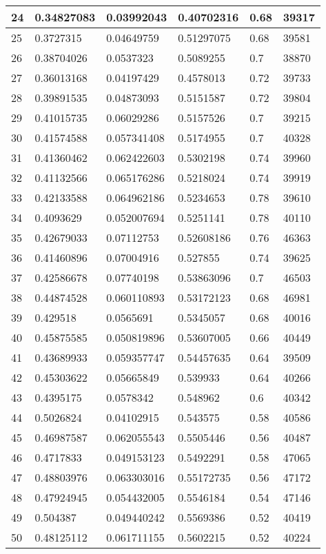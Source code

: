 \begin{longtable}{|l|l|l|l|l|l|}
24 & 0.34827083 & 0.03992043 & 0.40702316 & 0.68 & 39317 \\ \hline 
25 & 0.3727315 & 0.04649759 & 0.51297075 & 0.68 & 39581 \\ \hline 
26 & 0.38704026 & 0.0537323 & 0.5089255 & 0.7 & 38870 \\ \hline 
27 & 0.36013168 & 0.04197429 & 0.4578013 & 0.72 & 39733 \\ \hline 
28 & 0.39891535 & 0.04873093 & 0.5151587 & 0.72 & 39804 \\ \hline 
29 & 0.41015735 & 0.06029286 & 0.5157526 & 0.7 & 39215 \\ \hline 
30 & 0.41574588 & 0.057341408 & 0.5174955 & 0.7 & 40328 \\ \hline 
31 & 0.41360462 & 0.062422603 & 0.5302198 & 0.74 & 39960 \\ \hline 
32 & 0.41132566 & 0.065176286 & 0.5218024 & 0.74 & 39919 \\ \hline 
33 & 0.42133588 & 0.064962186 & 0.5234653 & 0.78 & 39610 \\ \hline 
34 & 0.4093629 & 0.052007694 & 0.5251141 & 0.78 & 40110 \\ \hline 
35 & 0.42679033 & 0.07112753 & 0.52608186 & 0.76 & 46363 \\ \hline 
36 & 0.41460896 & 0.07004916 & 0.527855 & 0.74 & 39625 \\ \hline 
37 & 0.42586678 & 0.07740198 & 0.53863096 & 0.7 & 46503 \\ \hline 
38 & 0.44874528 & 0.060110893 & 0.53172123 & 0.68 & 46981 \\ \hline 
39 & 0.429518 & 0.0565691 & 0.5345057 & 0.68 & 40016 \\ \hline 
40 & 0.45875585 & 0.050819896 & 0.53607005 & 0.66 & 40449 \\ \hline 
41 & 0.43689933 & 0.059357747 & 0.54457635 & 0.64 & 39509 \\ \hline 
42 & 0.45303622 & 0.05665849 & 0.539933 & 0.64 & 40266 \\ \hline 
43 & 0.4395175 & 0.0578342 & 0.548962 & 0.6 & 40342 \\ \hline 
44 & 0.5026824 & 0.04102915 & 0.543575 & 0.58 & 40586 \\ \hline 
45 & 0.46987587 & 0.062055543 & 0.5505446 & 0.56 & 40487 \\ \hline 
46 & 0.4717833 & 0.049153123 & 0.5492291 & 0.58 & 47065 \\ \hline 
47 & 0.48803976 & 0.063303016 & 0.55172735 & 0.56 & 47172 \\ \hline 
48 & 0.47924945 & 0.054432005 & 0.5546184 & 0.54 & 47146 \\ \hline 
49 & 0.504387 & 0.049440242 & 0.5569386 & 0.52 & 40419 \\ \hline 
50 & 0.48125112 & 0.061711155 & 0.5602215 & 0.52 & 40224 \\ \hline 
\end{longtable}